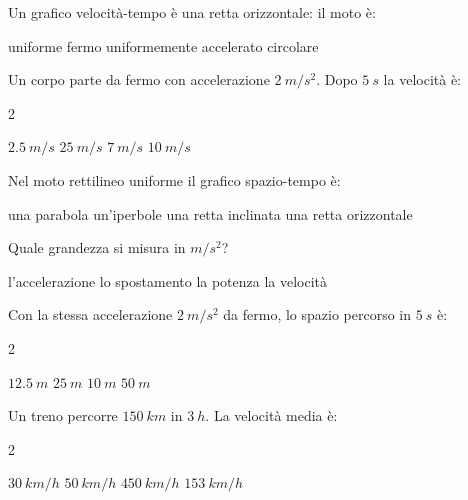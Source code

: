 \documentclass[a4paper,10pt]{exam}
\begin{document}
\vspace{2mm}
\begin{questions}
\question Un grafico velocità-tempo è una retta orizzontale: il moto è:
\vspace{0.2em}
\begin{choices}
\choice uniforme
\choice fermo
\choice uniformemente accelerato
\choice circolare
\end{choices}

\question Un corpo parte da fermo con accelerazione $\SI{2}{m/s^2}$. Dopo $\SI{5}{s}$ la velocità è:
\vspace{0.2em}
\begin{multicols}{2}
\begin{choices}
\choice $\SI{2.5}{m/s}$
\choice $\SI{25}{m/s}$
\choice $\SI{7}{m/s}$
\choice $\SI{10}{m/s}$
\end{choices}
\end{multicols}

\question Nel moto rettilineo uniforme il grafico spazio-tempo è:
\vspace{0.2em}
\begin{choices}
\choice una parabola
\choice un'iperbole
\choice una retta inclinata
\choice una retta orizzontale
\end{choices}

\question Quale grandezza si misura in $\si{m/s^2}$?
\vspace{0.2em}
\begin{choices}
\choice l'accelerazione
\choice lo spostamento
\choice la potenza
\choice la velocità
\end{choices}

\question Con la stessa accelerazione $\SI{2}{m/s^2}$ da fermo, lo spazio percorso in $\SI{5}{s}$ è:
\vspace{0.2em}
\begin{multicols}{2}
\begin{choices}
\choice $\SI{12.5}{m}$
\choice $\SI{25}{m}$
\choice $\SI{10}{m}$
\choice $\SI{50}{m}$
\end{choices}
\end{multicols}

\question Un treno percorre $\SI{150}{km}$ in $\SI{3}{h}$. La velocità media è:
\vspace{0.2em}
\begin{multicols}{2}
\begin{choices}
\choice $\SI{30}{km/h}$
\choice $\SI{50}{km/h}$
\choice $\SI{450}{km/h}$
\choice $\SI{153}{km/h}$
\end{choices}
\end{multicols}

\end{questions}
\end{document}
